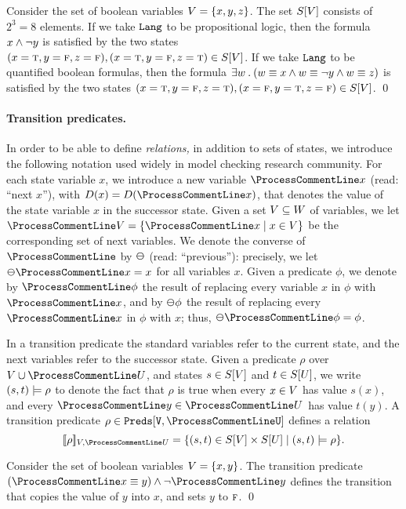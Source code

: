 \begin{examp}{}
Consider the set of boolean variables ${ V} = \{ x,y,z \}$. The
set ${ S}[{ V}]$ consists of $2^3 = 8$ elements. If we take
${\tt{Lang}}$ to be propositional logic, then the formula $x \wedge \neg
y$ is satisfied by the two states $(x=\mbox{\sc t},y=\mbox{\sc f},z=\mbox{\sc f}),
(x=\mbox{\sc t},y=\mbox{\sc f},z=\mbox{\sc t}) \in {S}[{ V}]$. If we take
${\tt{Lang}}$ to be quantified boolean formulas, then the formula $
  \exists w \:.\: (w \equiv x \wedge w \equiv \neg y \wedge w \equiv z)
$ is satisfied by the two states $(x=\mbox{\sc t},y=\mbox{\sc f},z=\mbox{\sc t}),
(x=\mbox{\sc f},y=\mbox{\sc t},z=\mbox{\sc f}) \in {S}[{ V}]$. \qed
\end{examp}

\paragraph{Transition predicates.}
In order to be able to define {\em relations,} in addition to sets
of states, we introduce the following notation used widely in
model checking research community. For each state variable $x$, we
introduce a new variable $\nx{x}$ (read: ``next $x$''), with
$\domain(x) = \domain(\nx{x})$, that denotes the value of the
state variable $x$ in the successor state. Given a set ${ V}
\subseteq {W}$ of variables, we let $\nx{\vars} = \set{\nx{x}
\mid x \in \vars}$ be the corresponding set of next variables. We
denote the converse of $\nx{}$ by $\pr{}$ (read: ``previous''):
precisely, we let $\pr{\nx{x}} = x$ for all variables $x$. Given a
predicate $\phi$, we denote by $\nx{\phi}$ the result of replacing
every variable $x$ in $\phi$ with $\nx{x}$, and by $\pr{\phi}$ the
result of replacing every $\nx{x}$ in $\phi$ with $x$; thus,
$\pr{\nx{\phi}} = \phi$.

In a transition predicate the standard variables refer to the
current state, and the next variables refer to the successor
state. Given a predicate $\rho$ over $\vars \union \nx{\avars}$,
and states $s \in {S}[{ V}]$ and $t \in {S}[{ U}]$, we
write $(s,t) \models \rho$ to denote the fact that $\rho$ is true
when every $x \in {V}$ has value $s(x)$, and every $\nx{y} \in
\nx{\avars}$ has value $t(y)$. A transition predicate $\rho \in
\Preds[\vars,\nx \avars]$ defines a relation
\[
  \semb{\rho}_{\vars,\nx{\avars}}
  = \set{(s,t) \in \states[\vars] \times \states[\avars] \mid
         (s,t) \sat \rho}.
\]

\begin{examp}{}
Consider the set of boolean variables ${ V} = \{ x,y \}$. The
transition predicate $(\nx{x} \equiv y) \und \no \nx{y}$ defines
the transition that copies the value of $y$ into $x$, and sets $y$
to $\mbox{\sc f}$. \qed
\end{examp}

